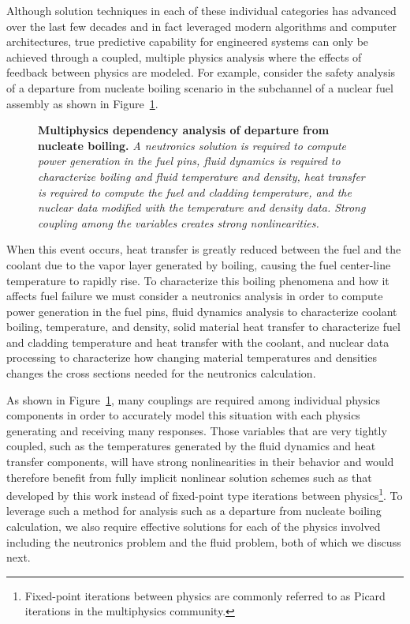 Although solution techniques in each of these individual categories
has advanced over the last few decades and in fact leveraged modern
algorithms and computer architectures, true predictive capability for
engineered systems can only be achieved through a coupled, multiple
physics analysis where the effects of feedback between physics are
modeled. For example, consider the safety analysis of a departure from
nucleate boiling scenario in the subchannel of a nuclear fuel
assembly as shown in Figure~\ref{fig:dnb_example}.

\begin{figure}[t!]
  \begin{center}
    \scalebox{1.5}{
       }
  \end{center}
  \caption{\textbf{Multiphysics dependency analysis of departure from
      nucleate boiling.} \textit{A neutronics solution is required to
      compute power generation in the fuel pins, fluid dynamics is
      required to characterize boiling and fluid temperature and
      density, heat transfer is required to compute the fuel and
      cladding temperature, and the nuclear data modified with the
      temperature and density data. Strong coupling among the
      variables creates strong nonlinearities.}}
  \label{fig:dnb_example}
\end{figure}

When this event occurs, heat transfer is greatly reduced between the
fuel and the coolant due to the vapor layer generated by boiling,
causing the fuel center-line temperature to rapidly rise. To
characterize this boiling phenomena and how it affects fuel failure we
must consider a neutronics analysis in order to compute power
generation in the fuel pins, fluid dynamics analysis to characterize
coolant boiling, temperature, and density, solid material heat
transfer to characterize fuel and cladding temperature and heat
transfer with the coolant, and nuclear data processing to characterize
how changing material temperatures and densities changes the cross
sections needed for the neutronics calculation.

As shown in Figure~\ref{fig:dnb_example}, many couplings are required
among individual physics components in order to accurately model this
situation with each physics generating and receiving many
responses. Those variables that are very tightly coupled, such as the
temperatures generated by the fluid dynamics and heat transfer
components, will have strong nonlinearities in their behavior and
would therefore benefit from fully implicit nonlinear solution schemes
such as that developed by this work instead of fixed-point type
iterations between physics\footnote{Fixed-point iterations between
  physics are commonly referred to as Picard iterations in the
  multiphysics community.}. To leverage such a method for analysis
such as a departure from nucleate boiling calculation, we also require
effective solutions for each of the physics involved including the
neutronics problem and the fluid problem, both of which we discuss
next.

